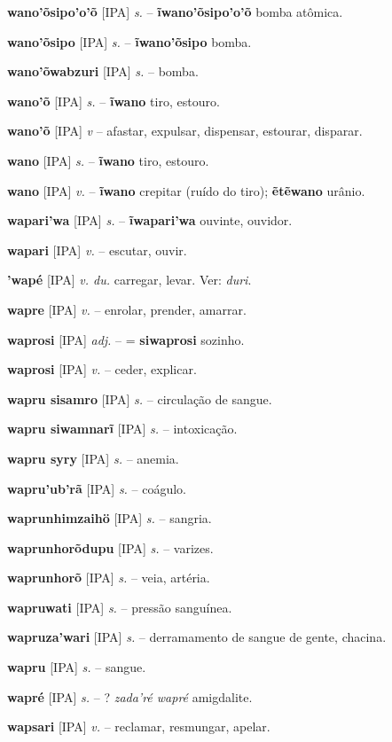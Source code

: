 \textbf{wano'õsipo'o'õ} [IPA] \textit{s.} -- \textbf{ĩwano'õsipo'o'õ} bomba atômica.

\textbf{wano'õsipo} [IPA] \textit{s.} -- \textbf{ĩwano'õsipo} bomba.

\textbf{wano'õwabzuri} [IPA] \textit{s.} -- bomba.

\textbf{wano'õ} [IPA] \textit{s.} -- \textbf{ĩwano} tiro, estouro.

\textbf{wano'õ} [IPA] \textit{v} -- afastar, expulsar, dispensar, estourar, disparar.

\textbf{wano} [IPA] \textit{s.} -- \textbf{ĩwano} tiro, estouro.

\textbf{wano} [IPA] \textit{v.} -- \textbf{ĩwano} crepitar (ruído do tiro); \textbf{ẽtẽwano} urânio.

\textbf{wapari'wa} [IPA] \textit{s.} -- \textbf{ĩwapari'wa} ouvinte, ouvidor.

\textbf{wapari} [IPA] \textit{v.} -- escutar, ouvir.

\textbf{'wapé} [IPA] \textit{v. du.} carregar, levar. Ver: \textit{duri}.

\textbf{wapre} [IPA] \textit{v.} -- enrolar, prender, amarrar.

\textbf{waprosi} [IPA] \textit{adj.} -- = \textbf{siwaprosi} sozinho.

\textbf{waprosi} [IPA] \textit{v.} -- ceder, explicar.

\textbf{wapru sisamro} [IPA] \textit{s.} -- circulação de sangue.

\textbf{wapru siwamnarĩ} [IPA] \textit{s.} -- intoxicação.

\textbf{wapru syry} [IPA] \textit{s.} -- anemia.

\textbf{wapru'ub'rã} [IPA] \textit{s.} -- coágulo.

\textbf{waprunhimzaihö} [IPA] \textit{s.} -- sangria.

\textbf{waprunhorõdupu} [IPA] \textit{s.} -- varizes.

\textbf{waprunhorõ} [IPA] \textit{s.} -- veia, artéria.

\textbf{wapruwati} [IPA] \textit{s.} -- pressão sanguínea.

\textbf{wapruza'wari} [IPA] \textit{s.} -- derramamento de sangue de gente, chacina.

\textbf{wapru} [IPA] \textit{s.} -- sangue.

\textbf{wapré} [IPA] \textit{s.} -- ? \textit{zada'ré wapré} amigdalite.

\textbf{wapsari} [IPA] \textit{v.} -- reclamar, resmungar, apelar.

